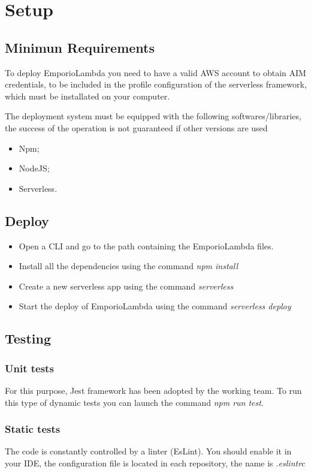 \section{Setup}

\subsection{Minimun Requirements}
To deploy EmporioLambda you need to have a valid AWS account to obtain AIM credentials, to be included in the profile configuration of 
the serverless framework, which must be installated on your computer.

The deployment system must be equipped with the following softwares/libraries, the success of the operation is not guaranteed if other versions are used


\begin{itemize}
    \item Npm;
    \item NodeJS;
    \item Serverless.
\end{itemize}

\subsection{Deploy}

\begin{itemize}
    \item Open a CLI and go to the path containing the EmporioLambda files.
    \item Install all the dependencies using the command \textit{npm install}
    \item Create a new serverless app using the command \textit{serverless}
    \item Start the deploy of EmporioLambda using the command \textit{serverless deploy}
\end{itemize}

\subsection{Testing}

\subsubsection{Unit tests}
For this purpose, Jest framework has been adopted by the working team. To run this type of dynamic tests
you can launch the command \textit{npm run test}.

\subsubsection{Static tests}
The code is constantly controlled by a linter (EsLint). You should enable it in your IDE, the configuration file is
located in each repository, the name is \textit{.eslintrc}